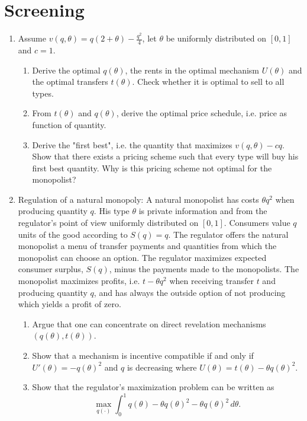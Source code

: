 \documentclass[a4paper,12pt]{article}
\begin{document}
\section{Screening}
\label{sec:screening}

\begin{enumerate}
\item Assume $v(q,\theta)=q(2+\theta)-\frac{q^{2}}{4}$, let $\theta$ be uniformly distributed on $[0,1]$ and $c=1$.
  \begin{enumerate}
  \item Derive the optimal $q(\theta)$, the rents in the optimal
    mechanism $U(\theta)$ and the optimal transfers $t(\theta)$. Check
    whether it is optimal to sell to all types.
   \item From $t(\theta)$ and $q(\theta)$, derive the optimal price schedule, i.e. price as function of quantity.
   \item Derive the "first best", i.e. the quantity that maximizes
    $v(q,\theta)-c q$. Show that there exists a pricing scheme such that
    every type will buy his first best quantity. Why is this pricing
    scheme not optimal for the monopolist?
\end{enumerate}
\item Regulation of a natural monopoly: A natural monopolist has costs $\theta q^2$ when producing quantity $q$. His type $\theta $ is private information and from the regulator's point of view uniformly distributed on $[0,1]$. Consumers value $q$ units of the good according to $S(q)=q$. The regulator offers the natural monopolist a menu of transfer payments and quantities from which the monopolist can choose an option. The regulator maximizes expected consumer surplus, $S(q)$, minus the payments made to the monopolists. The monopolist maximizes profits, i.e. $t-\theta  q^2$ when receiving transfer $t$ and producing quantity $q$, and has always the outside option of not producing which yields a profit of zero.
  \begin{enumerate}
  \item Argue that one can concentrate on direct revelation mechanisms $(q(\theta ),t(\theta ))$.
  \item Show that a mechanism is incentive compatible if and only if $U'(\theta )=-q(\theta )^2$ and $q$ is decreasing where $U(\theta )=t(\theta )-\theta q(\theta )^2$.
  \item Show that the regulator's maximization problem can be written as $$\max_{q(\cdot)}\int_0^1 q(\theta )-\theta q(\theta )^2-\theta q(\theta )^2\,d\theta. $$

\end{enumerate}
\end{enumerate}
\end{document}
